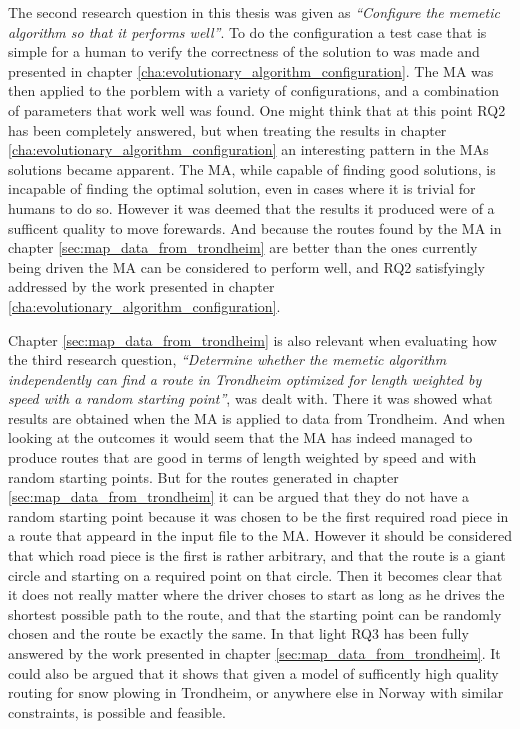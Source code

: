 The second research question in this thesis was given as \emph{\enquote{Configure the memetic algorithm so that it performs well}}. To do the configuration a test case that is simple for a human to verify the correctness of the solution to was made and presented in chapter \ref{cha:evolutionary_algorithm_configuration}. The MA was then applied to the porblem with a variety of configurations, and a combination of parameters that work well was found. One might think that at this point RQ2 has been completely answered, but when treating the results in chapter \ref{cha:evolutionary_algorithm_configuration} an interesting pattern in the MAs solutions became apparent. The MA, while capable of finding good solutions, is incapable of finding the optimal solution, even in cases where it is trivial for humans to do so. However it was deemed that the results it produced were of a sufficent quality to move forewards. And because the routes found by the MA in chapter \ref{sec:map_data_from_trondheim} are better than the ones currently being driven the MA can be considered to perform well, and RQ2 satisfyingly addressed by the work presented in chapter \ref{cha:evolutionary_algorithm_configuration}.

Chapter \ref{sec:map_data_from_trondheim} is also relevant when evaluating how the third research question, \emph{\enquote{Determine whether the memetic algorithm independently can find a route in Trondheim optimized for length weighted by speed with a random starting point}}, was dealt with. There it was showed what results are obtained when the MA is applied to data from Trondheim. And when looking at the outcomes it would seem that the MA has indeed managed to produce routes that are good in terms of length weighted by speed and with random starting points. But for the routes generated in chapter \ref{sec:map_data_from_trondheim} it can be argued that they do not have a random starting point because it was chosen to be the first required road piece in a route that appeard in the input file to the MA. However it should be considered that which road piece is the first is rather arbitrary, and that the route is a giant circle and starting on a required point on that circle. Then it becomes clear that it does not really matter where the driver choses to start as long as he drives the shortest possible path to the route, and that the starting point can be randomly chosen and the route be exactly the same. In that light RQ3 has been fully answered by the work presented in chapter \ref{sec:map_data_from_trondheim}. It could also be argued that it shows that given a model of sufficently high quality routing for snow plowing in Trondheim, or anywhere else in Norway with similar constraints, is possible and feasible.

